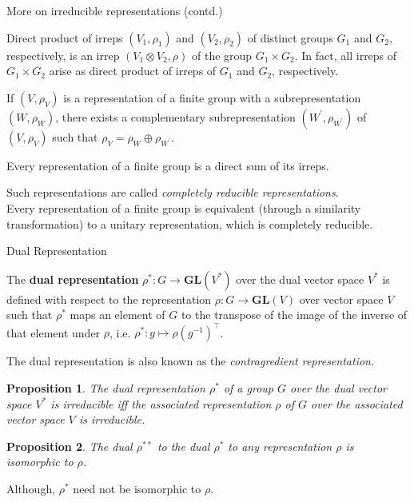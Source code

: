 \documentclass{beamer}
\newcommand\boldtext[1]{\textcolor{bolds}{\textbf{#1}}}
\newcommand\italictext[1]{\textcolor{italics}{\textit{#1}}}
\newtheorem{proposition}{Proposition}
\begin{document}
\begin{frame}{More on irreducible representations (contd.)}
    \begin{theorem}
        Direct product of irreps $(V_1,\rho_1)$ and $(V_2,\rho_2)$ of distinct groups $G_1$ and $G_2$, respectively, is an irrep $(V_1\otimes V_2,\rho)$ of the group $G_1\times G_2$. In fact, all irreps of $G_1\times G_2$ arise as direct product of irreps of $G_1$ and $G_2$, respectively.
    \end{theorem}
    \begin{theorem}
        If $(V,\rho_V)$ is a representation of a finite group with a subrepresentation $(W,\rho_W)$, there exists a complementary subrepresentation $(W^\prime,\rho_{W^\prime})$ of $(V,\rho_V)$ such that $\rho_V=\rho_W\oplus\rho_{W^\prime}$.
    \end{theorem}
    \begin{corollary}
        Every representation of a finite group is a direct sum of its irreps.
    \end{corollary}
    Such representations are called \italictext{completely reducible representations}.\\
    Every representation of a finite group is equivalent (through a similarity transformation) to a unitary representation, which is completely reducible.
\end{frame}

\begin{frame}{Dual Representation}
    \begin{definition}
        The \boldtext{dual representation} $\rho^*:G\xrightarrow{} \mathbf{GL}(V^*)$ over the dual vector space $V^*$ is defined with respect to the representation $\rho:G\xrightarrow{} \mathbf{GL}(V)$ over vector space $V$ such that $\rho^*$ maps an element of $G$ to the transpose of the image of the inverse of that element under $\rho$, i.e. $\rho^*:g\mapsto{\rho(g^{-1})}^\intercal$.
    \end{definition}
    The dual representation is also known as the \italictext{contragredient representation}.
    \begin{proposition}
        The dual representation $\rho^*$ of a group $G$ over the dual vector space $V^*$ is irreducible iff the associated representation $\rho$ of $G$ over the associated vector space $V$ is irreducible.
    \end{proposition}
    \begin{proposition}
        The dual ${\rho}^{**}$ to the dual $\rho^*$ to any representation $\rho$ is isomorphic to $\rho$.
    \end{proposition}
    Although, $\rho^*$ need not be isomorphic to $\rho$.
\end{frame}
\end{document}
